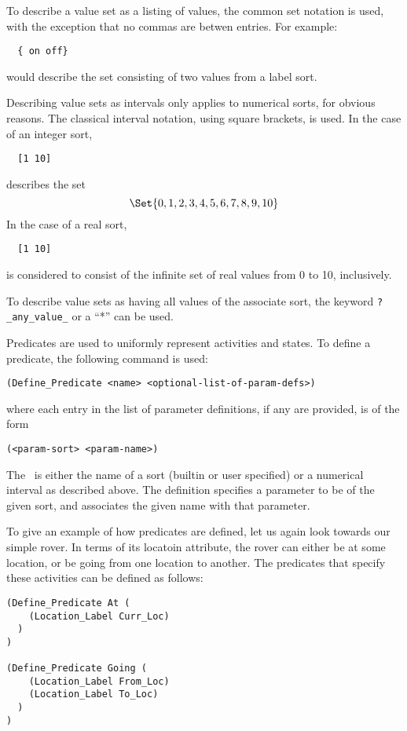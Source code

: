To describe a value set as a listing of values, the common set
notation is used, with the exception that no commas are betwen
entries.  For example:
  \begin{verbatim}
  { on off}  \end{verbatim}
  would describe the set consisting of two values from a label sort.

Describing value sets as intervals only applies to numerical sorts,
for obvious reasons.  The classical interval notation, using square
brackets, is used.  In the case of an integer sort,
  \begin{verbatim}
  [1 10] \end{verbatim}
describes the set 
   $$\Set{0,1,2,3,4,5,6,7,8,9,10}$$  
In the case of a real sort,
  \begin{verbatim}
  [1 10] \end{verbatim}
  is considered to consist of the infinite set of real values from 0
to 10, inclusively.

To describe value sets as having all values of the associate sort, the
keyword {\tt?\_any\_value\_} or a ``*'' can be used.





Predicates are used to uniformly represent activities and states.  To
define a predicate, the following command is used:
\begin{verbatim}
(Define_Predicate <name> <optional-list-of-param-defs>)
\end{verbatim}
  where each entry in the list of parameter definitions, if any are 
provided, is of the form
\begin{verbatim}
(<param-sort> <param-name>) 
\end{verbatim}
  The {\tt <param-sort>}\ is either the name of a sort (builtin or
user specified) or a numerical interval as described above.  The
definition specifies a parameter to be of the given sort, and
associates the given name with that parameter.

To give an example of how predicates are defined, let us again look
towards our simple rover.  In terms of its locatoin attribute, the
rover can either be at some location, or be going from one location to
another.  The predicates that specify these activities can be defined
as follows:
  \begin{verbatim}
(Define_Predicate At (
    (Location_Label Curr_Loc)
  )
)

(Define_Predicate Going (
    (Location_Label From_Loc) 
    (Location_Label To_Loc)
  )
)
  \end{verbatim}


